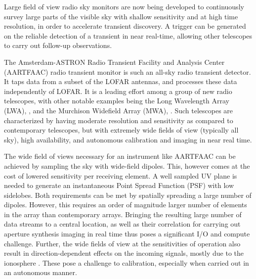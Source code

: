 \documentclass{ws-jai}
\begin{document}
Large field of  view radio sky monitors are now  being developed to continuously
survey large parts of the visible sky  with shallow sensitivity and at high time
resolution,  in order  to  accelerate  transient discovery.   A  trigger can  be
generated on the  reliable detection of a transient in  near real-time, allowing
other telescopes to carry out follow-up observations.


The  Amsterdam-ASTRON Radio  Transient Facility  and Analysis  Center (AARTFAAC)
radio transient  monitor is such  an all-sky  radio transient detector.  It taps
data from a subset of the LOFAR antennas, and processes these data independently
of LOFAR.  It  is a leading effort  among a group of new  radio telescopes, with
other   notable    examples   being    the   Long   Wavelength    Array   (LWA),
\cite{ellingsonLWA1},   and  the   Murchison   Widefield   Array  (MWA),   \cite
     {tingay2013murchison}.   Such   telescopes  are  characterized   by  having
     moderate resolution and sensitivity as compared to contemporary telescopes,
     but  with  extremely  wide  fields   of  view  (typically  all  sky),  high
     availability, and autonomous calibration and imaging in near real time.

The  wide field  of  views necessary  for  an instrument  like  AARTFAAC can  be
achieved by sampling the sky with wide-field dipoles. This, however comes at the
cost of lowered  sensitivity per receiving element.  A well  sampled UV plane is
needed  to  generate an  instantaneous  Point  Spread  Function (PSF)  with  low
sidelobes.  Both requirements  can be met by spatially spreading  a large number
of  dipoles.  However,  this requires  an order  of magnitude  larger number  of
elements in  the array than  contemporary arrays.  Bringing the  resulting large
number of data streams  to a central location, as well  as their correlation for
carrying out  aperture synthesis imaging in  real time thus poses  a significant
I/O and compute challenge. Further, the wide fields of view at the sensitivities
of operation also result in direction-dependent effects on the incoming signals,
mostly              due              to              the              ionosphere
\citep{intema2009ionospheric,wijnholds2010calibration}.  These  pose a challenge
to calibration, especially when carried out in an autonomous manner.
\end{document}
